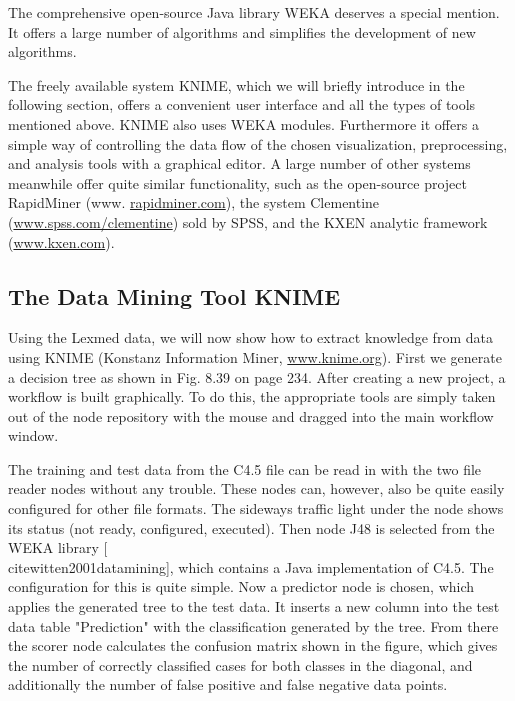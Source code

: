\documentclass[10pt]{book}
\begin{document}
The comprehensive open-source Java library WEKA deserves a special mention. It offers a large number of algorithms and simplifies the development of new algorithms.

The freely available system KNIME, which we will briefly introduce in the following section, offers a convenient user interface and all the types of tools mentioned above. KNIME also uses WEKA modules. Furthermore it offers a simple way of controlling the data flow of the chosen visualization, preprocessing, and analysis tools with a graphical editor. A large number of other systems meanwhile offer quite similar functionality, such as the open-source project RapidMiner (www. \href{http://rapidminer.com}{rapidminer.com}), the system Clementine (\href{http://www.spss.com/clementine}{www.spss.com/clementine}) sold by SPSS, and the KXEN analytic framework (\href{http://www.kxen.com}{www.kxen.com}).

\subsection{The Data Mining Tool KNIME}
Using the Lexmed data, we will now show how to extract knowledge from data using KNIME (Konstanz Information Miner, \href{http://www.knime.org}{www.knime.org}). First we generate a decision tree as shown in Fig. 8.39 on page 234. After creating a new project, a workflow is built graphically. To do this, the appropriate tools are simply taken out of the node repository with the mouse and dragged into the main workflow window.

The training and test data from the C4.5 file can be read in with the two file reader nodes without any trouble. These nodes can, however, also be quite easily configured for other file formats. The sideways traffic light under the node shows its status (not ready, configured, executed). Then node J48 is selected from the WEKA library [\\cite{witten2001datamining}], which contains a Java implementation of C4.5. The configuration for this is quite simple. Now a predictor node is chosen, which applies the generated tree to the test data. It inserts a new column into the test data table "Prediction" with the classification generated by the tree. From there the scorer node calculates the confusion matrix shown in the figure, which gives the number of correctly classified cases for both classes in the diagonal, and additionally the number of false positive and false negative data points.
\end{document}
